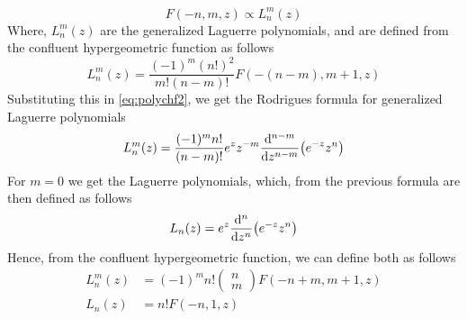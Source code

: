 \documentclass[../qm.tex]{subfiles}
\begin{document}
	\begin{equation*}
		F(-n,m,z)\propto L^m_n(z)
	\end{equation*}
	Where, $L^m_n(z)$ are the generalized Laguerre polynomials, and are defined from the confluent hypergeometric function as follows
	\begin{equation}
		L^m_n(z)=\frac{(-1)^m(n!)^2}{m!(n-m)!}F(-(n-m),m+1,z)
		\label{eq:genlaguerrepol}
	\end{equation}
	Substituting this in \eqref{eq:polychf2}, we get the Rodrigues formula for generalized Laguerre polynomials
	\begin{equation}
		L^m_n(z)=\frac{(-1)^mn!}{(n-m)!}e^zz^{-m}\derivative[n-m]{z}(e^{-z}z^n)
		\label{eq:laguerrerod}
	\end{equation}
	For $m=0$ we get the Laguerre polynomials, which, from the previous formula are then defined as follows
	\begin{equation}
		L_n(z)=e^z\derivative[n]{z}(e^{-z}z^n)
		\label{eq:laguerrepol}
	\end{equation}
	Hence, from the confluent hypergeometric function, we can define both as follows
	\begin{equation}
		\begin{aligned}
			L^m_n(z)&=(-1)^mn!\begin{pmatrix}n\\m\end{pmatrix}F(-n+m,m+1,z)\\
			L_n(z)&=n!F(-n,1,z)
		\end{aligned}
		\label{eq:laguerrebothchf}
	\end{equation}
\end{document}
